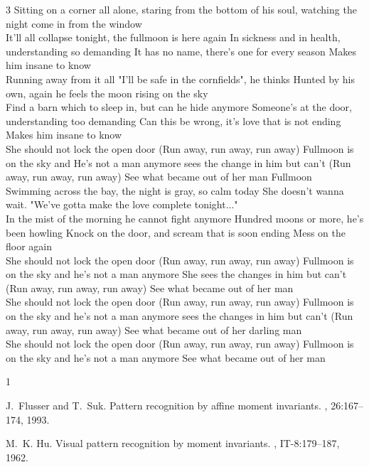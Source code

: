 \documentclass{sciposter}
\begin{document}
\begin{multicols}{3}
Sitting on a corner all alone,
staring from the bottom of his soul,
watching the night come in from the window
\\
It'll all collapse tonight, the fullmoon is here again
In sickness and in health, understanding so demanding
It has no name, there's one for every season
Makes him insane to know
\\
Running away from it all
"I'll be safe in the cornfields", he thinks
Hunted by his own,
again he feels the moon rising on the sky
\\
Find a barn which to sleep in, but can he hide anymore
Someone's at the door, understanding too demanding
Can this be wrong, it's love that is not ending
Makes him insane to know
\\
She should not lock the open door
(Run away, run away, run away)
Fullmoon is on the sky and He's not a man anymore
sees the change in him but can't
(Run away, run away, run away)
See what became out of her man
Fullmoon
\\
Swimming across the bay,
the night is gray, so calm today
She doesn't wanna wait.
"We've gotta make the love complete tonight..."
\\
In the mist of the morning he cannot fight anymore
Hundred moons or more, he's been howling
Knock on the door, and scream that is soon ending
Mess on the floor again
\\
She should not lock the open door
(Run away, run away, run away)
Fullmoon is on the sky and he's not a man anymore
She sees the changes in him but can't
(Run away, run away, run away)
See what became out of her man
\\
She should not lock the open door
(Run away, run away, run away)
Fullmoon is on the sky and he's not a man anymore
sees the changes in him but can't
(Run away, run away, run away)
See what became out of her darling man
\\
She should not lock the open door
(Run away, run away, run away)
Fullmoon is on the sky and he's not a man anymore
See what became out of her man
 



\begin{thebibliography}{1}

J.~Flusser and T.~Suk.
\newblock Pattern recognition by affine moment invariants.
, 26:167--174, 1993.

M.~K. Hu.
\newblock Visual pattern recognition by moment invariants.
, IT-8:179--187, 1962.


\end{thebibliography}
\end{multicols}
\end{document}
